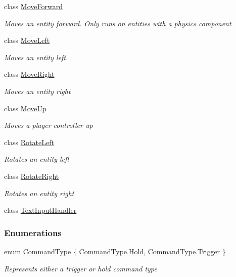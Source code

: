 \begin{DoxyCompactItemize}
class \hyperlink{class_m_b2_d_1_1_i_o_1_1_move_forward}{Move\+Forward}
\begin{DoxyCompactList}\small\item\em Moves an entity forward. Only runs on entities with a physics component \end{DoxyCompactList}\item 
class \hyperlink{class_m_b2_d_1_1_i_o_1_1_move_left}{Move\+Left}
\begin{DoxyCompactList}\small\item\em Moves an entity left. \end{DoxyCompactList}\item 
class \hyperlink{class_m_b2_d_1_1_i_o_1_1_move_right}{Move\+Right}
\begin{DoxyCompactList}\small\item\em Moves an entity right \end{DoxyCompactList}\item 
class \hyperlink{class_m_b2_d_1_1_i_o_1_1_move_up}{Move\+Up}
\begin{DoxyCompactList}\small\item\em Moves a player controller up \end{DoxyCompactList}\item 
class \hyperlink{class_m_b2_d_1_1_i_o_1_1_rotate_left}{Rotate\+Left}
\begin{DoxyCompactList}\small\item\em Rotates an entity left \end{DoxyCompactList}\item 
class \hyperlink{class_m_b2_d_1_1_i_o_1_1_rotate_right}{Rotate\+Right}
\begin{DoxyCompactList}\small\item\em Rotates an entity right \end{DoxyCompactList}\item 
class \hyperlink{class_m_b2_d_1_1_i_o_1_1_text_input_handler}{Text\+Input\+Handler}
\end{DoxyCompactItemize}
\subsubsection*{Enumerations}
\begin{DoxyCompactItemize}
\item 
enum \hyperlink{namespace_m_b2_d_1_1_i_o_ab5f95f3fe9e652778b62bdf943168a68}{Command\+Type} \{ \hyperlink{namespace_m_b2_d_1_1_i_o_ab5f95f3fe9e652778b62bdf943168a68abcd8db575b47c838e5d551e3973db4ac}{Command\+Type.\+Hold}, 
\hyperlink{namespace_m_b2_d_1_1_i_o_ab5f95f3fe9e652778b62bdf943168a68af698f67f5666aff10729d8a1cb1c14d2}{Command\+Type.\+Trigger}
 \}\begin{DoxyCompactList}\small\item\em Represents either a trigger or hold command type \end{DoxyCompactList}
\end{DoxyCompactItemize}



